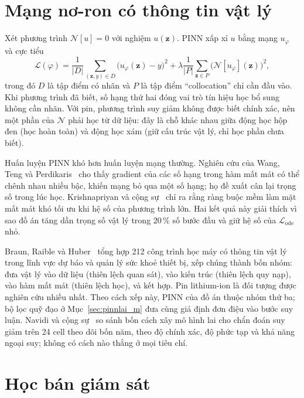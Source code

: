 \documentclass[12pt,a4paper,oneside]{report}
\theoremstyle{plain}
\theoremstyle{definition}
\begin{document}
\section{Mạng nơ-ron có thông tin vật lý}

Xét phương trình $\mathcal{N}[u] = 0$ với nghiệm $u(\mathbf{z})$. PINN xấp xỉ $u$ bằng mạng $u_\varphi$ và cực
tiểu
\begin{equation}
\mathcal{L}(\varphi) = \frac{1}{|D|}\sum_{(\mathbf{z}, y) \in D}\big(u_\varphi(\mathbf{z}) - y\big)^2
 + \lambda \frac{1}{|P|}\sum_{\mathbf{z} \in P}\big(\mathcal{N}[u_\varphi](\mathbf{z})\big)^2,
\end{equation}
trong đó $D$ là tập điểm có nhãn và $P$ là tập điểm “collocation” chỉ cần đầu vào. Khi phương trình đã biết,
số hạng thứ hai đóng vai trò tín hiệu học bổ sung không cần nhãn. Với pin, phương trình suy giảm không được
biết chính xác, nên một phần của $\mathcal{N}$ phải học từ dữ liệu: đây là chỗ khác nhau giữa động học hộp đen
(học hoàn toàn) và động học xám (giữ cấu trúc vật lý, chỉ học phần chưa biết).

Huấn luyện PINN khó hơn huấn luyện mạng thường. Nghiên cứu của Wang, Teng và Perdikaris~\cite{wang2021grad} cho thấy
gradient của các số hạng trong hàm mất mát có thể chênh nhau nhiều bậc, khiến mạng bỏ qua một số hạng; họ đề
xuất cân lại trọng số trong lúc học. Krishnapriyan và cộng sự~\cite{krishnapriyan2021} chỉ ra rằng ràng buộc
mềm làm mặt mất mát khó tối ưu khi hệ số của phương trình lớn. Hai kết quả này giải thích vì sao đồ án tăng dần
trọng số vật lý trong 20\,\% số bước đầu và giữ hệ số của $\mathcal{L}_\text{ode}$ nhỏ.

Braun, Raible và Huber~\cite{braun2026} tổng hợp 212 công trình học máy có thông tin vật lý trong lĩnh vực dự báo
và quản lý sức khoẻ thiết bị, xếp chúng thành bốn nhóm: đưa vật lý vào dữ liệu (thiên lệch quan sát), vào kiến
trúc (thiên lệch quy nạp), vào hàm mất mát (thiên lệch học), và kết hợp. Pin lithium-ion là đối tượng được nghiên
cứu nhiều nhất. Theo cách xếp này, PINN của đồ án thuộc nhóm thứ ba; bộ lọc quỹ đạo ở Mục~\ref{sec:pinnlai_m}
đưa cùng giả định đơn điệu vào bước suy luận. Navidi và cộng sự~\cite{navidi2024} so sánh bốn cách xây mô hình
lai cho chẩn đoán suy giảm trên 24 cell theo dõi bốn năm, theo độ chính xác, độ phức tạp và khả năng ngoại suy;
không có cách nào thắng ở mọi tiêu chí.

\section{Học bán giám sát}
\end{document}
